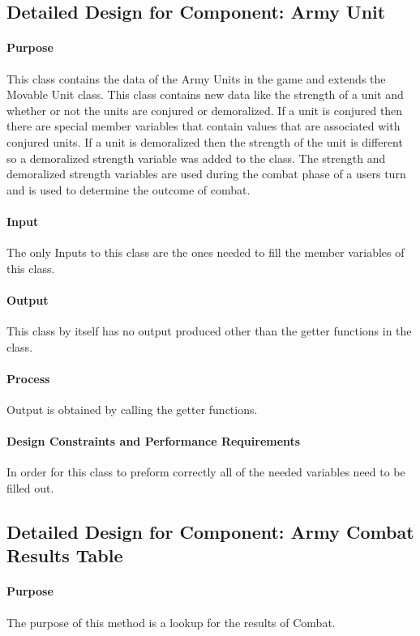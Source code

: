 \documentclass[12pt,a4paper,titlepage]{article}
\begin{document}
\subsection{Detailed Design for Component: Army Unit}
\paragraph{Purpose} This class contains the data of the Army Units in the game and extends the Movable Unit class. This class contains new data like the strength of a unit and whether or not the units are conjured or demoralized. If a unit is conjured then there are special member variables that contain values that are associated with conjured units. If a unit is demoralized then the strength of the unit is different so a demoralized strength variable was added to the class. The strength and demoralized strength variables are used during the combat phase of a users turn and is used to determine the outcome of combat. 
\paragraph{Input} The only Inputs to this class are the ones needed to fill the member variables of this class.
\paragraph{Output} This class by itself has no output produced other than the getter functions in the class.
\paragraph{Process} Output is obtained by calling the getter functions. 
\paragraph{Design Constraints and Performance Requirements}	In order for this class to preform correctly all of the needed variables need to be filled out.

\subsection{Detailed Design for Component: Army Combat Results Table}
\paragraph{Purpose} The purpose of this method is a lookup for the results of Combat. 
\end{document}
